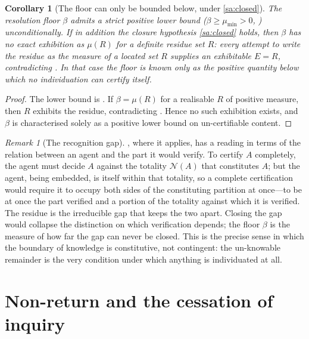 \documentclass[11pt,twocolumn,a4paper]{article}
\theoremstyle{thmstyle}
\newtheorem{corollary}[theorem]{Corollary}
\theoremstyle{definition}
\theoremstyle{remark}
\newtheorem{remark}[theorem]{Remark}
\newcommand{\thick}{\beta}
\newcommand{\Neg}{\mathcal{N}}
\begin{document}
\begin{corollary}[The floor can only be bounded below, under \ref{sa:closed}]
\label{cor:floor-only-bounded}
The resolution floor $\thick$ admits a strict positive lower bound
\textup{(}$\thick\ge\mu_{\min}>0$, \textup{)}
unconditionally. If in addition the closure hypothesis \ref{sa:closed} holds,
then $\thick$ has no exact exhibition as $\mu(R)$ for a definite residue set $R$:
every attempt to write the residue as the measure of a located set $R$ supplies
an exhibitable $E=R$, contradicting . In that case
the floor is known only as the positive quantity below which no individuation can
certify itself.
\end{corollary}

\begin{proof}
The lower bound is . If $\thick=\mu(R)$ for a realisable $R$
of positive measure, then $R$ exhibits the residue, contradicting
. Hence no such exhibition exists, and $\thick$ is
characterised solely as a positive lower bound on un-certifiable content.
\end{proof}

\begin{remark}[The recognition gap]
\label{rem:recognition-gap}
, where it applies, has a reading in terms of the
relation between an agent and the part it would verify. To certify $A$ completely, the agent must
decide $A$ against the totality $\Neg(A)$ that constitutes $A$; but the agent,
being embedded, is itself within that totality, so a complete certification would
require it to occupy both sides of the constituting partition at once---to be at
once the part verified and a portion of the totality against which it is
verified. The residue is the irreducible gap that keeps the two apart. Closing
the gap would collapse the distinction on which verification depends; the floor
$\thick$ is the measure of how far the gap can never be closed. This is the
precise sense in which the boundary of knowledge is constitutive, not contingent:
the un-knowable remainder is the very condition under which anything is
individuated at all.
\end{remark}


\section{Non-return and the cessation of inquiry}
\label{sec:inquiry}
\end{document}
